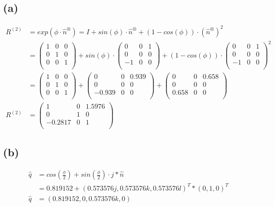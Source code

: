 \documentclass{../Vorlage/mat}
\begin{document}
\subsection*{(a)}
\begin{align*}
R^{(2)} & = exp(\phi \cdot \hat{n}^\otimes) = I + sin(\phi) \cdot \hat{n}^\otimes + (1 - cos(\phi)) \cdot (\hat{n}^\otimes)^2\\
& = 
\begin{pmatrix}
1 & 0 & 0 \\
0 & 1 & 0\\
0 & 0 & 1 \\
\end{pmatrix} + sin(\phi) \cdot
\begin{pmatrix}
0 & 0 & 1 \\
0 & 0 & 0 \\
-1 & 0 & 0 \\
\end{pmatrix} + (1 - cos(\phi)) \cdot
\begin{pmatrix}
0 & 0 & 1 \\   
0 & 0 & 0 \\
-1 & 0 & 0 \\
\end{pmatrix}^2 						\\
& = 
\begin{pmatrix}
1 & 0 & 0 \\
0 & 1 & 0\\
0 & 0 & 1 \\
\end{pmatrix} +
\begin{pmatrix}
0 & 0 & 0.939 \\
0 & 0 & 0 \\
-0.939 & 0 & 0 \\
\end{pmatrix} + 
\begin{pmatrix}
0 & 0 & 0.658 \\   
0 & 0 & 0 \\
0.658 & 0 & 0 \\
\end{pmatrix} 						\\
R^{(2)} & =  
\begin{pmatrix}
1 & 0 & 1.5976 \\
0 & 1 & 0\\
-0.2817 & 0 & 1 \\
\end{pmatrix}
\end{align*}
\subsection*{(b)}
\begin{align*}
\hat{q} & = cos(\frac{\phi}{2}) + sin(\frac{\phi}{2}) \cdot j * \hat{n}\\
& = 0.819152 + (0.573576j,0.573576k,0.573576l)^T * (0,1,0)^T\\
\hat{q} & = (0.819152, 0, 0.573576k, 0)
\end{align*}
\end{document}
